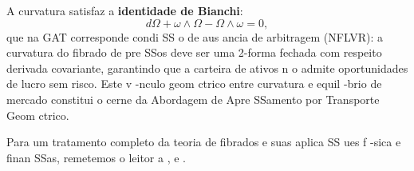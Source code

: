 A curvatura satisfaz a \textbf{identidade de Bianchi}:
\begin{equation}
 d\Omega + \omega\wedge\Omega - \Omega\wedge\omega = 0,
\end{equation}
que na GAT corresponde condi SS o de aus ancia de arbitragem (NFLVR): a curvatura do fibrado de pre SSos deve ser uma 2-forma fechada com respeito derivada covariante, garantindo que a carteira de ativos n o admite oportunidades de lucro sem risco. Este v -nculo geom ctrico entre curvatura e equil -brio de mercado constitui o cerne da Abordagem de Apre SSamento por Transporte Geom ctrico.

Para um tratamento completo da teoria de fibrados e suas aplica SS ues f -sica e finan SSas, remetemos o leitor a ,  e .

\endinput


